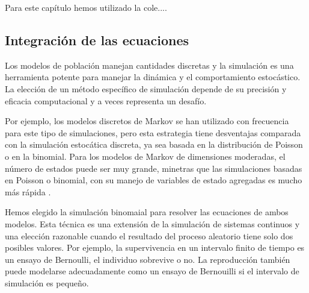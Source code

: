 Para este capítulo hemos utilizado la cole....

\subsection{Integración de las ecuaciones}
\label{DINAMINCA_NumSim}

Los modelos de población manejan cantidades discretas y la simulación es una herramienta potente para manejar la dinámica y el comportamiento estocástico. La elección de un método específico de simulación depende de su precisión y eficacia computacional y a veces representa un desafío.

Por ejemplo, los modelos discretos de Markov se han utilizado con frecuencia para este tipo de simulaciones, pero esta estrategia tiene desventajas comparada con la simulación estocática discreta, ya sea basada en la distribución de Poisson o en la binomial. Para los modelos de Markov de dimensiones moderadas, el número de estados puede ser muy grande, minetras que las simulaciones basadas en Poisson o binomial, con su manejo de variables de estado agregadas es mucho más rápida  \cite{gustafsson2007bringing, balcan2009multiscale}.

Hemos elegido la simulación binomaial para resolver las ecuaciones de ambos modelos. Esta técnica es una extensión de la simulación de sistemas continuos y una elección razonable cuando el resultado del proceso aleatorio tiene solo dos posibles valores. Por ejemplo, la supervivencia en un intervalo finito de tiempo es un ensayo de Bernoulli, el individuo sobrevive o no. La reproducción también puede modelarse adecuadamente como un ensayo de Bernouilli si el intervalo de simulación es pequeño. 

